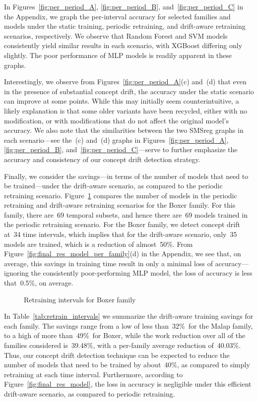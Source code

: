 \documentclass[12pt]{article}
\begin{document}
In Figures~\ref{fig:per_period_A}, \ref{fig:per_period_B}, and~\ref{fig:per_period_C}
in the Appendix, we graph the per-interval accuracy for selected families and models
under the static training, periodic retraining, and drift-aware retraining scenarios, respectively.
We observe that Random Forest and SVM models consistently yield similar results
in each scenario, with XGBoost differing only slightly. The poor performance of  
MLP models is readily apparent in these graphs.

Interestingly, we observe from Figures~\ref{fig:per_period_A}(c) and~(d)
that even in the presence of substantial concept drift, the accuracy
under the static scenario
can improve at some points. While this may initially seem counterintuitive, 
a likely explanation is that some older variants have been recycled,
either with no modification, or with modifications that
do not affect the original model's accuracy. We also note that the
similarities between the two SMSreg graphs 
in each scenario---see the~(c) and~(d) graphs in 
Figures~\ref{fig:per_period_A}, \ref{fig:per_period_B}, 
and~\ref{fig:per_period_C}---serve to further emphasize
the accuracy and consistency of our concept drift detection strategy.

Finally, we consider the savings---in terms of the number of models 
that need to be trained---under the drift-aware scenario, 
as compared to the periodic retraining scenario.
Figure~\ref{fig:retraining_intervals} compares the number of models in the 
periodic retraining and drift-aware retraining scenarios for the Boxer family.
For this family, there are~69 temporal subsets, and hence there 
are~69 models trained in the periodic retraining scenario. 
For the Boxer family, we detect concept drift at~34
time intervals, which implies that for the drift-aware scenario, 
only~35 models are trained, which is a reduction of almost~50\%.
From Figure~\ref{fig:final_res_model_per_family}(d) in the Appendix, 
we see that, on average, this savings in training time
result in only a minimal loss of accuracy---ignoring the 
consistently poor-performing
MLP model, the loss of accuracy is less that~0.5\%, on average.

\begin{figure}[!htb]
    \centering
    
    \caption{Retraining intervals for Boxer family}
    \label{fig:retraining_intervals}
\end{figure}

In Table~\ref{tab:retrain_intervals} we summarize the drift-aware training 
savings for each family. The savings
range from a low of less than~32\%\ for the Malap family, to a high of more 
than~49\%\ for Boxer, while the work reduction 
over all of the families considered is~39.48\%,
with a per-family average reduction of~40.03\%. Thus, our 
concept drift detection technique can be expected to reduce the number of models
that need to be trained by about~40\%, as compared to simply retraining at each
time interval. Furthermore, according to Figure~\ref{fig:final_res_model}, the loss in
accuracy is negligible under this efficient drift-aware scenario, as compared
to periodic retraining.
\end{document}
